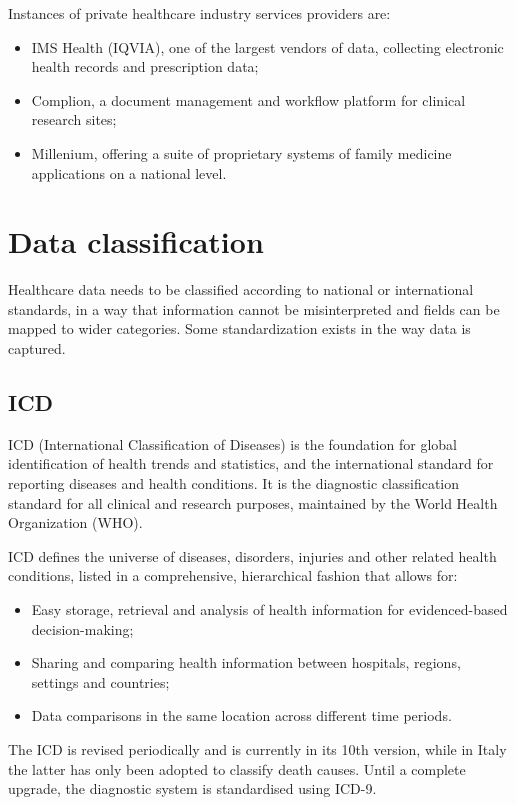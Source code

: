 Instances of private healthcare industry services providers are:
\begin{itemize}
	\item IMS Health (IQVIA), one of the largest vendors of data, collecting electronic health records and prescription data;
	\item Complion, a document management and workflow platform for clinical research sites;
	\item Millenium, offering a suite of proprietary systems of family medicine applications on a national level.
\end{itemize}


 


\section{Data classification}
Healthcare data needs to be classified according to national or international standards, in a way that information cannot be misinterpreted and fields can be mapped to wider categories. Some standardization exists in the way data is captured.

\subsection{ICD}
ICD (International Classification of Diseases) is the foundation for global identification of health trends and statistics, and the international standard for reporting diseases and health conditions. It is the diagnostic classification standard for all clinical and research purposes\cite{who}, maintained by the World Health Organization (WHO).

ICD defines the universe of diseases, disorders, injuries and other related health conditions, listed in a comprehensive, hierarchical fashion that allows for: 
\begin{itemize}
	\item Easy storage, retrieval and analysis of health information for evidenced-based decision-making;
	\item Sharing and comparing health information between hospitals, regions, settings and countries;
	\item Data comparisons in the same location across different time periods\cite{whoicd}.
\end{itemize}

The ICD is revised periodically and is currently in its 10th version, while in Italy the latter has only been adopted to classify death causes\cite{icdit}. Until a complete upgrade, the diagnostic system is standardised using ICD-9.

